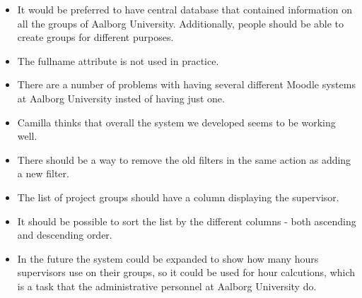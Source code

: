 \begin{itemize}
	\item It would be preferred to have central database that contained information on all the groups of Aalborg University.
Additionally, people should be able to create groups for different purposes.
  \item The fullname attribute is not used in practice.
	\item There are a number of problems with having several different Moodle systems at Aalborg University insted of having just one.
	\item Camilla thinks that overall the system we developed seems to be working well.
	\item There should be a way to remove the old filters in the same action as adding a new filter.
	\item The list of project groups should have a column displaying the supervisor.
	\item It should be possible to sort the list by the different columns - both ascending and descending order.
	\item In the future the system could be expanded to show how many hours supervisors use on their groups, so it could be used for hour calcutions, which is a task that the administrative personnel at Aalborg University do.
\end{itemize}